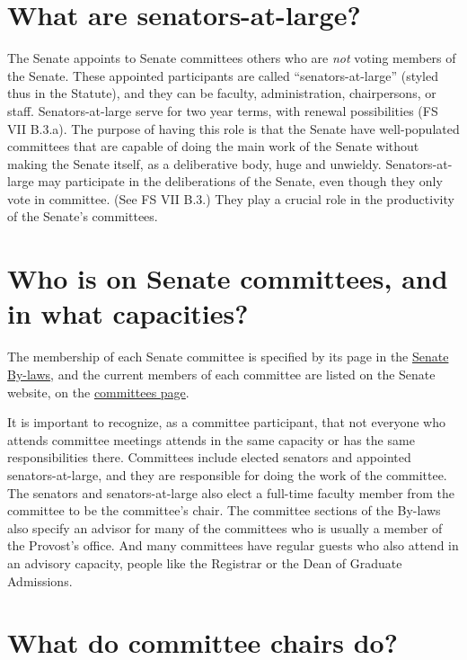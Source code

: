 \documentclass[12pt]{article}
\begin{document}
\section{What are senators-at-large?}\label{what-are-senators-at-large}

The Senate appoints to Senate committees others who are \emph{not}
voting members of the Senate. These appointed participants are called
``senators-at-large'' (styled thus in the Statute), and they can be
faculty, administration, chairpersons, or staff. Senators-at-large serve
for two year terms, with renewal possibilities (FS VII B.3.a). The
purpose of having this role is that the Senate have well-populated
committees that are capable of doing the main work of the Senate without
making the Senate itself, as a deliberative body, huge and unwieldy.
Senators-at-large may participate in the deliberations of the Senate,
even though they only vote in committee. (See FS VII B.3.) They play a
crucial role in the productivity of the Senate's committees.

\section{Who is on Senate committees, and in what
capacities?}\label{who-is-on-senate-committees-and-in-what-capacities}

The membership of each Senate committee is specified by its page in the
\href{https://www.hofstra.edu/sites/default/files/2022-04/senatebylaws.pdf}{Senate
By-laws}, and the current members of each committee are listed on the
Senate website, on the
\href{https://www.hofstra.edu/senate/committees-subcommittees.html}{committees
page}.

It is important to recognize, as a committee participant, that not
everyone who attends committee meetings attends in the same capacity or
has the same responsibilities there. Committees include elected senators
and appointed senators-at-large, and they are responsible for doing the
work of the committee. The senators and senators-at-large also elect a
full-time faculty member from the committee to be the committee's chair.
The committee sections of the By-laws also specify an advisor for many
of the committees who is usually a member of the Provost's office. And
many committees have regular guests who also attend in an advisory
capacity, people like the Registrar or the Dean of Graduate Admissions.

\section{What do committee chairs
do?}\label{what-do-committee-chairs-do}
\end{document}

